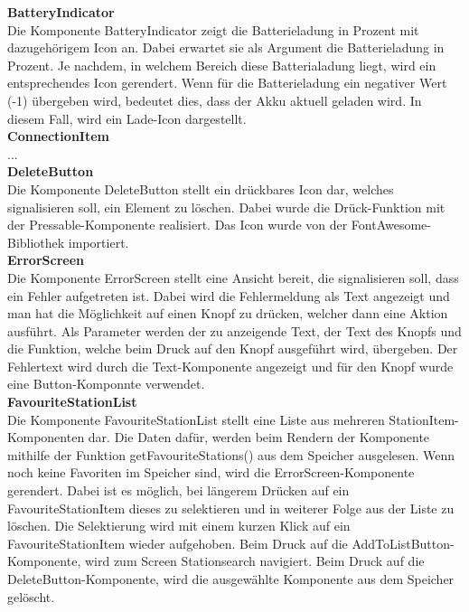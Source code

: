 \documentclass[11pt, twoside]{article}
\begin{document}
\textbf{BatteryIndicator} \\
Die Komponente BatteryIndicator zeigt die Batterieladung in Prozent mit dazugehörigem Icon an. Dabei erwartet sie als Argument die Batterieladung in Prozent. Je nachdem, in welchem Bereich diese Batterialadung liegt, wird ein entsprechendes Icon gerendert. Wenn für die Batterieladung ein negativer Wert (-1) übergeben wird, bedeutet dies, dass der Akku aktuell geladen wird. In diesem Fall, wird ein Lade-Icon dargestellt. \newline \\
\textbf{ConnectionItem} \\
... \newline \\
\textbf{DeleteButton} \\
Die Komponente DeleteButton stellt ein drückbares Icon dar, welches signalisieren soll, ein Element zu löschen. Dabei wurde die Drück-Funktion mit der Pressable-Komponente realisiert. Das Icon wurde von der FontAwesome-Bibliothek importiert. \newline \\
\textbf{ErrorScreen} \\
Die Komponente ErrorScreen stellt eine Ansicht bereit, die signalisieren soll, dass ein Fehler aufgetreten ist. Dabei wird die Fehlermeldung als Text angezeigt und man hat die Möglichkeit auf einen Knopf zu drücken, welcher dann eine Aktion ausführt. Als Parameter werden der zu anzeigende Text, der Text des Knopfs und die Funktion, welche beim Druck auf den Knopf ausgeführt wird, übergeben. Der Fehlertext wird durch die Text-Komponente angezeigt und für den Knopf wurde eine Button-Komponnte verwendet. \newline \\
\textbf{FavouriteStationList} \\
Die Komponente FavouriteStationList stellt eine Liste aus mehreren StationItem-Komponenten dar. Die Daten dafür, werden beim Rendern der Komponente mithilfe der Funktion getFavouriteStations() aus dem Speicher ausgelesen. Wenn noch keine Favoriten im Speicher sind, wird die ErrorScreen-Komponente gerendert. Dabei ist es möglich, bei längerem Drücken auf ein FavouriteStationItem dieses zu selektieren und in weiterer Folge aus der Liste zu löschen. Die Selektierung wird mit einem kurzen Klick auf ein FavouriteStationItem wieder aufgehoben. Beim Druck auf die AddToListButton-Komponente, wird zum Screen \glqq Stationsearch \grqq{} navigiert. Beim Druck auf die DeleteButton-Komponente, wird die ausgewählte Komponente aus dem Speicher gelöscht. \newline \\
\end{document}
